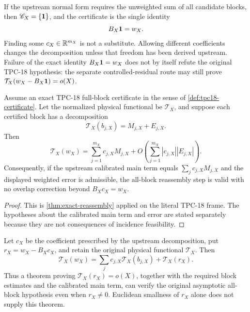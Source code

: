 \begin{remark}
If the upstream normal form requires the unweighted sum of all
candidate blocks, then
\(\mathscr C_X=\{\mathbf 1\}\), and the certificate is the single identity
\[
 B_X\mathbf 1=w_X.
\]
Finding some \(c_X\in\mathbb R^{m_X}\) is not a substitute.  Allowing
different coefficients changes the decomposition unless that freedom
has been derived upstream.  Failure of the exact identity
\(B_X\mathbf 1=w_X\) does not by itself refute the original TPC-18
hypothesis: the separate controlled-residual route may still prove
\(\mathcal T_X(w_X-B_X\mathbf 1)=o(X)\).
\end{remark}

\begin{theorem}
\label{thm:tpc18-cover-transfer}
Assume an exact TPC-18 full-block certificate in the sense of
\cref{def:tpc18-certificate}.  Let the normalized physical functional
be \(\mathcal T_X\), and suppose each certified block has a decomposition
\[
 \mathcal T_X(b_{j,X})=M_{j,X}+E_{j,X}.
\]
Then
\begin{equation}
 \mathcal T_X(w_X)
 =
 \sum_{j=1}^{m_X}c_{j,X}M_{j,X}
 +
 O\!\left(
 \sum_{j=1}^{m_X}|c_{j,X}||E_{j,X}|
 \right).
 \label{eq:tpc18-exact-transfer}
\end{equation}
Consequently, if the upstream calibrated main term equals
\(\sum_jc_{j,X}M_{j,X}\) and the displayed weighted error is
admissible, the all-block reassembly step is valid with no overlap
correction beyond \(B_Xc_X=w_X\).
\end{theorem}

\begin{proof}
This is \cref{thm:exact-reassembly} applied on the literal TPC-18
frame.  The hypotheses about the calibrated main term and error are
stated separately because they are not consequences of incidence
feasibility.
\end{proof}

\begin{proposition}
\label{prop:tpc18-controlled-residual}
Let \(c_X\) be the coefficient prescribed by the upstream
decomposition, put \(r_X=w_X-B_Xc_X\), and retain the original
physical functional \(\mathcal T_X\).  Then
\[
 \mathcal T_X(w_X)
 =
 \sum_jc_{j,X}\mathcal T_X(b_{j,X})
 +
 \mathcal T_X(r_X).
\]
Thus a theorem proving \(\mathcal T_X(r_X)=o(X)\), together with the
required block estimates and the calibrated main term, can verify the
original asymptotic all-block hypothesis even when \(r_X\ne0\).
Euclidean smallness of \(r_X\) alone does not supply this theorem.
\end{proposition}


